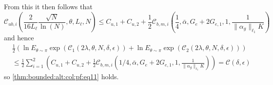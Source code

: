 \documentclass{article}
\begin{document}
     From this it then follows that 
     \begin{equation}
      \label{thm:bounded:alt:col:pf:eq5}
         \mathcal{C}_{ub,i}(\frac{2}{16L_{\ell}}\frac{\sqrt{N}}{\ln(N)},\theta,L_{\ell},N) \le 
           C_{u,1}+C_{u,2}+\frac{1}{2}\mathcal{C}_{b,m,i}(\frac{1}{4}, \bar{\alpha}, G_e+2G_{e,1},1, \frac{1}{\|\alpha_g\|_{\ell_1}K})
     \end{equation}
     and hence
     \begin{align*}
          & \frac{1}{2} \left(   \ln E_{\theta \sim \pi} \exp(\mathcal{C}_1(2\lambda,\theta,N,\delta,\epsilon)) +
           \ln E_{\theta \sim \pi} \exp(\mathcal{C}_2(2\lambda,\theta,N,\delta,\epsilon)) 
          \right)  \\
          & \le \frac{1}{2} \sum_{i=1}^{2} \left(C_{u,1}+C_{u,2}+ \frac{1}{2}\mathcal{C}_{b,m,i}(1/4, \bar{\alpha}, G_e+2G_{e,1}, 1, \frac{1}{\|\alpha_g\|_{\ell_1}K})\right) = \mathcal{C}(\delta,\epsilon)
      \end{align*}
      so \eqref{thm:bounded:alt:col:pf:eq11} holds.
     
\end{document}
